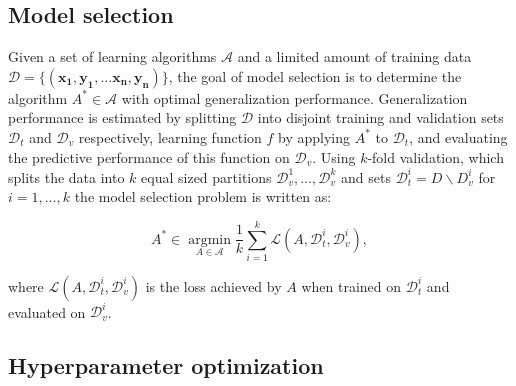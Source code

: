 \documentclass[journal]{IEEEtran}
\begin{document}
\subsection{Model selection}

Given a set of learning algorithms $\mathcal{A}$ and a limited amount of training data $\mathcal{D} = \{ (\mathbf{x_1}, \mathbf{y_1}, \ldots \mathbf{x_n}, \mathbf{y_n}) \}$, the goal of model selection is to determine the algorithm $A^* \in \mathcal{A}$ with optimal generalization performance. Generalization performance is estimated by splitting $\mathcal{D}$ into disjoint training and validation sets $\mathcal{D}_{t}$ and $\mathcal{D}_{v}$ respectively, learning function $f$ by applying $A^*$ to $\mathcal{D}_{t}$, and evaluating the predictive performance of this function on $\mathcal{D}_{v}$. Using $k$-fold validation, which splits the data into $k$ equal sized partitions $ \mathcal{D}^{1}_{v}, \ldots,  \mathcal{D}^{k}_{v}$ and sets $ \mathcal{D}^{i}_{t} =  D \backslash D^{i}_{v}$ for $i = 1, \ldots, k$ the model selection problem is written as:

\begin{equation}
A^* \in \underset{A \in \mathcal{A}}{\operatorname{argmin}} \frac{1}{k} \sum_{i=1}^{k} \mathcal{L} \left( A, \mathcal{D}^{i}_{t},  \mathcal{D}^{i}_{v} \right),
\end{equation}

where $ \mathcal{L} \left( A, \mathcal{D}^{i}_{t},  \mathcal{D}^{i}_{v} \right) $ is the loss achieved by $A$ when trained on $\mathcal{D}^{i}_{t}$ and evaluated on $\mathcal{D}^{i}_{v}$. 

\subsection{Hyperparameter optimization}
\end{document}
